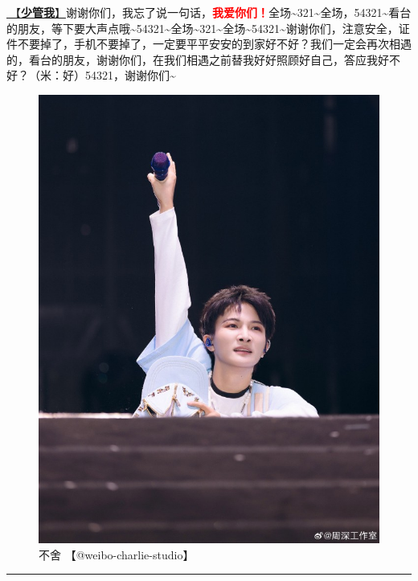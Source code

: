 \documentclass[]{ctexbook}
\begin{document}
\hyperref[watch-ur-manners]{🎵【\textbf{少管我}】}谢谢你们，我忘了说一句话，\textbf{\textcolor{red}{我爱你们！}}全场\textasciitilde321\textasciitilde 全场，54321\textasciitilde 看台的朋友，等下要大声点哦\textasciitilde54321\textasciitilde 全场\textasciitilde321\textasciitilde 全场\textasciitilde54321\textasciitilde 谢谢你们，注意安全，证件不要掉了，手机不要掉了，一定要平平安安的到家好不好？我们一定会再次相遇的，看台的朋友，谢谢你们，在我们相遇之前替我好好照顾好自己，答应我好不好？（米：好）54321，谢谢你们\textasciitilde{}

\begin{figure}

{\centering \includegraphics[width=350pt]{img/beijing20240922/003} 

}

\caption{不舍 【@weibo-charlie-studio】}\label{fig:unnamed-chunk-111}
\end{figure}

\begin{center}\rule{0.5\linewidth}{0.5pt}\end{center}
\end{document}
